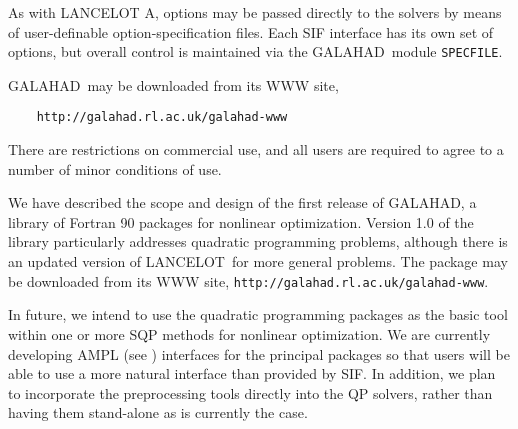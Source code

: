 \documentclass[twoside]{article}
\newcommand{\gal}{{\sf GALAHAD}}
\newcommand{\lan}{{\sf LANCELOT}}
\newcommand{\lana}{{\sf LANCELOT A}}
\begin{document}
As with \lana, options may be passed directly to the solvers by means of
user-definable option-specification files. Each SIF interface
has its own set of options, but overall control is maintained via
the \gal\ module {\tt SPECFILE}.

{}

\gal\ may be downloaded from its WWW site,
\begin{verbatim}
    http://galahad.rl.ac.uk/galahad-www
\end{verbatim}
There are restrictions on commercial use, and all users are required to
agree to a number of minor conditions of use.


We have described the scope and design of the first release of \gal,
a library of Fortran 90 packages for nonlinear optimization.
Version 1.0 of the library particularly addresses quadratic programming
problems, although there is an updated version of \lan\ for more general
problems. The package may be downloaded from its WWW site,
{\tt http://galahad.rl.ac.uk/galahad-www}.

In future, we intend to use the quadratic programming packages as the
basic tool within one or more SQP methods for nonlinear optimization.
We are currently developing AMPL (see ) interfaces
for the principal packages so that users will be able to use a more
natural interface than provided by SIF. In addition, we plan to incorporate
the preprocessing tools directly into the QP solvers, rather than having
them stand-alone as is currently the case.

\newpage
\end{document}
